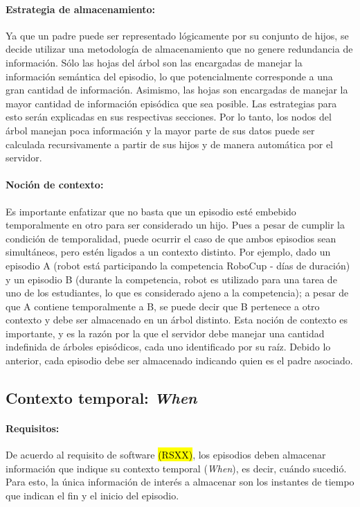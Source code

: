 \paragraph{Estrategia de almacenamiento:}
Ya que un padre puede ser representado lógicamente por su conjunto de hijos, se decide utilizar una metodología de almacenamiento que no genere redundancia de información. Sólo las hojas del árbol son las encargadas de manejar la información semántica del episodio, lo que potencialmente corresponde a una gran cantidad de información. Asimismo, las hojas son encargadas de manejar la mayor cantidad de información episódica que sea posible. Las estrategias para esto serán explicadas en sus respectivas secciones. Por lo tanto, los nodos del árbol manejan poca información y la mayor parte de sus datos puede ser calculada recursivamente a partir de sus hijos y de manera automática por el servidor.

\paragraph{Noción de contexto:}
Es importante enfatizar que no basta que un episodio esté embebido temporalmente en otro para ser considerado un hijo. Pues a pesar de cumplir la condición de temporalidad, puede ocurrir el caso de que ambos episodios sean simultáneos, pero estén ligados a un contexto distinto. Por ejemplo, dado un episodio A (robot está participando la competencia RoboCup - días de duración) y un episodio B (durante la competencia, robot es utilizado para una tarea de uno de los estudiantes, lo que es considerado ajeno a la competencia); a pesar de que A contiene temporalmente a B, se puede decir que B pertenece a otro contexto y debe ser almacenado en un árbol distinto. Esta noción de contexto es importante, y es la razón por la que el servidor debe manejar una cantidad indefinida de árboles episódicos, cada uno identificado por su raíz. Debido lo anterior, cada episodio debe ser almacenado indicando quien es el padre asociado.

 
 
\subsection{Contexto temporal: \textit{When}}\label{sec:design_ep_when}

\paragraph{Requisitos:}
De acuerdo al requisito de software \hl{(RSXX)}, los episodios deben almacenar información que indique su contexto temporal (\textit{When}), es decir, cuándo  sucedió. Para esto, la única información de interés a almacenar son los instantes de tiempo que indican el fin y el inicio del episodio.

